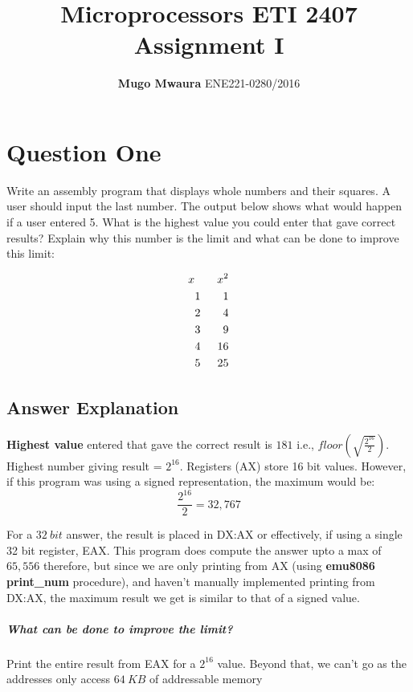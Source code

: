 \documentclass[]{article}
\title{Microprocessors ETI 2407 \\
Assignment I}
\author{\textbf{Mugo Mwaura} 
	ENE221-0280/2016}
\date{August 31, 2020\endgraf\rule{\textwidth}{.9pt}}
\begin{document}
\maketitle



\section{Question One}


\justify
Write an assembly program that displays whole numbers and their squares. A user should
input the last number. The output below shows what would happen if a user entered 5. What
is the highest value you could enter that gave correct results? Explain why this number is the
limit and what can be done to improve this limit:


\begin{align*}
x \qquad x^2 \\
1 \qquad 1 \\
2 \qquad 4 \\
3\qquad 9 \\
4 \hspace*{1.5em} 16 \\
5\hspace*{1.5em} 25\\
\end{align*}

\subsection{Answer Explanation}

\textbf{Highest value} entered that gave the correct result is $181$ i.e., $floor\left(\sqrt{\frac{2^{16}}{2}}\right)$.
Highest number giving result = $2^{16}$.
Registers (AX) store 16 bit values. However, if this program was using a signed
representation, the maximum would be:
\begin{equation*}
\frac{2^{16}}{2} = 32,767
\end{equation*}


For a $32 \ bit$ answer, the result is placed in DX:AX or effectively, if using a single 32 bit register, EAX.
This program does compute the answer upto a max of $65,556$ therefore,
but since we are only printing from AX (using \textbf{emu8086 print\_num} procedure), and haven't manually implemented
printing from DX:AX, the maximum result we get is similar to that of a signed value.


\subparagraph{What can be done to improve the limit?}
Print the entire result from EAX for a $2^{16}$ value. Beyond that, we can't go as the addresses
only access $64 \ KB$ of addressable memory
\end{document}
